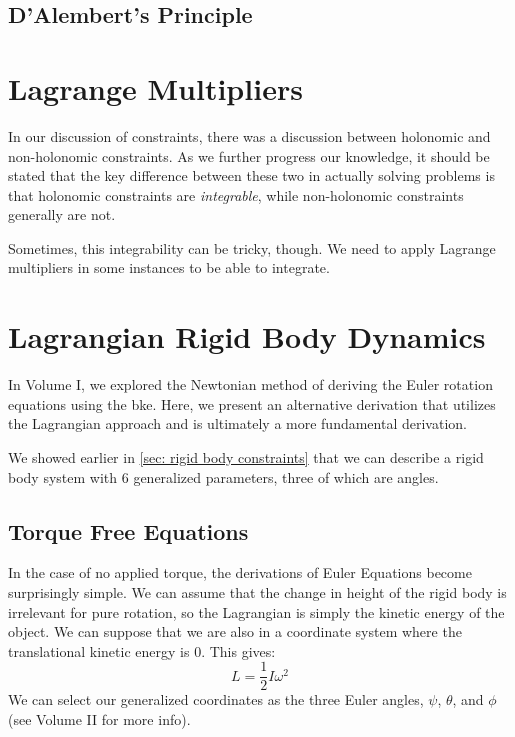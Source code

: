 \subsection{D'Alembert's Principle}

\section{Lagrange Multipliers}
In our discussion of constraints, there was a discussion between holonomic and non-holonomic constraints. As we further progress our knowledge, it should be stated that the key difference between these two in actually solving problems is that holonomic constraints are \textit{integrable}, while non-holonomic constraints generally are not.

Sometimes, this integrability can be tricky, though. We need to apply Lagrange multipliers in some instances to be able to integrate.

\section{Lagrangian Rigid Body Dynamics}

In Volume I, we explored the Newtonian method of deriving the Euler rotation equations using the \gls{bke}. Here, we present an alternative derivation that utilizes the \gls{Lagrangian} approach and is ultimately a more fundamental derivation.

We showed earlier in \autoref{sec: rigid body constraints} that we can describe a \gls{rigid body} system with 6 generalized parameters, three of which are angles.
\subsection{Torque Free Equations}
In the case of no applied torque, the derivations of \glspl{Euler Equation} become surprisingly simple. We can assume that the change in height of the \gls{rigid body} is irrelevant for pure rotation, so the \gls{Lagrangian} is simply the kinetic energy of the object. We can suppose that we are also in a coordinate system where the translational kinetic energy is 0. This gives:
\begin{equation}\label{eq:rigid body KE}
L=\frac{1}{2}I\omega^2
\end{equation}
We can select our generalized coordinates as the three Euler angles, $\psi$, $\theta$, and $\phi$ (see Volume II for more info).

